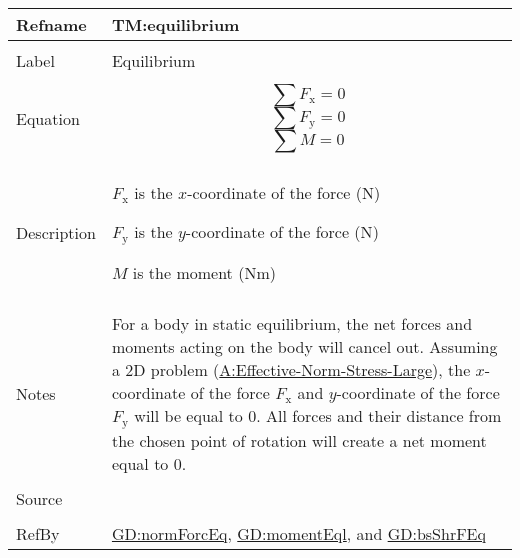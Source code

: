 \documentclass[12pt]{article}
\begin{document}
\begin{minipage}{\textwidth}
\begin{tabular}{>{\raggedright}p{}>{\raggedright\arraybackslash}p{}}
\toprule \textbf{Refname} & \textbf{TM:equilibrium}
\label{TM:equilibrium}
\\ \midrule \\
Label & Equilibrium
        
\\ \midrule \\
Equation & \begin{displaymath}
           \displaystyle\sum{{F_{\text{x}}}}=0
           \end{displaymath}
           \begin{displaymath}
           \displaystyle\sum{{F_{\text{y}}}}=0
           \end{displaymath}
           \begin{displaymath}
           \displaystyle\sum{M}=0
           \end{displaymath}
\\ \midrule \\
Description & \begin{symbDescription}
              \item{${F_{\text{x}}}$ is the $x$-coordinate of the force (${\text{N}}$)}
              \end{symbDescription}
              \begin{symbDescription}
              \item{${F_{\text{y}}}$ is the $y$-coordinate of the force (${\text{N}}$)}
              \end{symbDescription}
              \begin{symbDescription}
              \item{$M$ is the moment ($\text{N}\text{m}$)}
              \end{symbDescription}
\\ \midrule \\
Notes & For a body in static equilibrium, the net forces and moments acting on the body will cancel out. Assuming a 2D problem (\hyperref[assumpENSL]{A:Effective-Norm-Stress-Large}), the $x$-coordinate of the force ${F_{\text{x}}}$ and $y$-coordinate of the force ${F_{\text{y}}}$ will be equal to $0$. All forces and their distance from the chosen point of rotation will create a net moment equal to $0$.
        
\\ \midrule \\
Source & \cite{fredlund1977}
         
\\ \midrule \\
RefBy & \hyperref[GD:normForcEq]{GD:normForcEq}, \hyperref[GD:momentEql]{GD:momentEql}, and \hyperref[GD:bsShrFEq]{GD:bsShrFEq}
        
\\ \bottomrule
\end{tabular}
\end{minipage}
\end{document}
